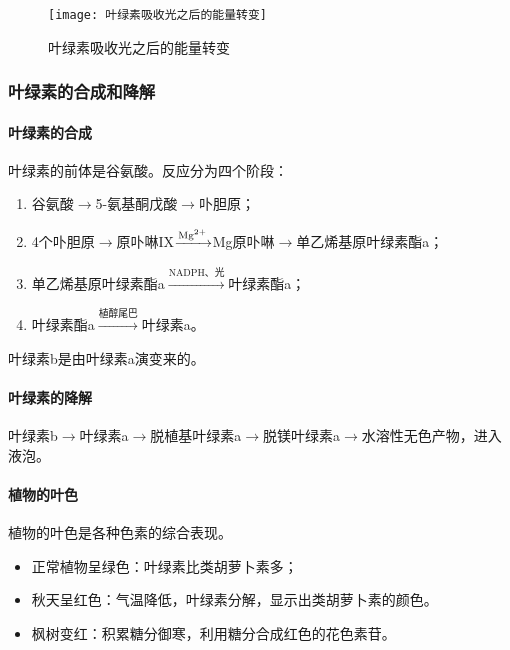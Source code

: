 \begin{figure}[htbp]
	\centering
	\texttt{[image: 叶绿素吸收光之后的能量转变]}
	\caption{叶绿素吸收光之后的能量转变}
	\label{fig:yelvsu_light_absorb}
\end{figure}


\subsubsection{叶绿素的合成和降解}

\paragraph{叶绿素的合成}

叶绿素的前体是谷氨酸。反应分为四个阶段：
\begin{enumerate}
	\item 谷氨酸$\longrightarrow$5-氨基酮戊酸$\longrightarrow$卟胆原；
	\item 4个卟胆原$\longrightarrow$原卟啉IX$\xrightarrow{\ce{Mg^{2+}}}$Mg原卟啉$\longrightarrow$单乙烯基原叶绿素酯a；
	\item 单乙烯基原叶绿素酯a$\xrightarrow{\text{NADPH、光}}$叶绿素酯a；
	\item 叶绿素酯a$\xrightarrow{植醇尾巴}$叶绿素a。
\end{enumerate}

叶绿素b是由叶绿素a演变来的。

\paragraph{叶绿素的降解}

叶绿素b$\longrightarrow$叶绿素a$\longrightarrow$脱植基叶绿素a$\longrightarrow$脱镁叶绿素a$\longrightarrow$水溶性无色产物，进入液泡。

\paragraph{植物的叶色}

植物的叶色是各种色素的综合表现。

\begin{itemize}
	\item 正常植物呈绿色：叶绿素比类胡萝卜素多；
	\item 秋天呈红色：气温降低，叶绿素分解，显示出类胡萝卜素的颜色。
	\item 枫树变红：积累糖分御寒，利用糖分合成红色的花色素苷。
\end{itemize}

